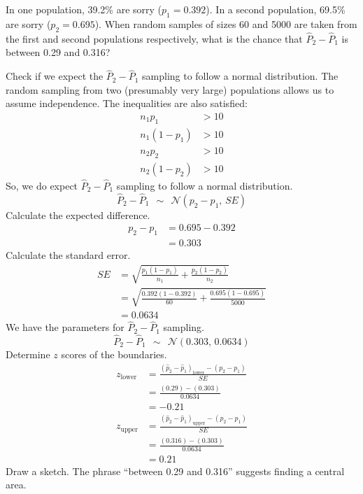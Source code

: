 
\begin{question}
In one population, 39.2\% are sorry (\(p_1 = 0.392\)). In a second
population, 69.5\% are sorry (\(p_2 = 0.695\)). When random samples of
sizes 60 and 5000 are taken from the first and second populations
respectively, what is the chance that \(\hat{P}_2 - \hat{P}_1\) is
between 0.29 and 0.316?
\end{question}

\begin{solution}
Check if we expect the \(\hat{P}_2 - \hat{P}_1\) sampling to follow a
normal distribution. The random sampling from two (presumably very
large) populations allows us to assume independence. The inequalities
are also satisfied: \[
\begin{aligned}
n_1 p_1 &> 10 \\
n_1 (1-p_1) &> 10\\
n_2 p_2 &> 10 \\
n_2 (1 -p_2) &> 10
\end{aligned}
\] So, we do expect \(\hat{P}_2 - \hat{P}_1\) sampling to follow a
normal distribution.
\[\hat{P}_2 - \hat{P}_1 ~~\sim~~ \mathcal{N}(p_2-p_1,\,SE)\] Calculate
the expected difference. \[
\begin{aligned}
p_2-p_1 &= 0.695-0.392\\
   &= 0.303
\end{aligned}
\] Calculate the standard error. \[
\begin{aligned}
SE &= \sqrt{\frac{p_1(1-p_1)}{n_1}+\frac{p_2(1-p_2)}{n_2}}\\[1em]
   &= \sqrt{\frac{0.392(1-0.392)}{60}+\frac{0.695(1-0.695)}{5000}}\\[1em]
   &= 0.0634
\end{aligned}
\] We have the parameters for \(\hat{P}_2 - \hat{P}_1\) sampling.
\[\hat{P}_2 - \hat{P}_1 ~~\sim~~ \mathcal{N}(0.303,\,0.0634)\] Determine
\(z\) scores of the boundaries. \[
\begin{aligned}
z_\text{lower}  &= \frac{(\hat{p}_2-\hat{p}_1)_\text{lower}-(p_2-p_1)}{SE} \\[1em]
   &= \frac{(0.29) - (0.303)}{0.0634} \\[1em]
   &= -0.21\\[1em]
z_\text{upper}  &= \frac{(\hat{p}_2-\hat{p}_1)_\text{upper}-(p_2-p_1)}{SE} \\[1em]
   &= \frac{(0.316) - (0.303)}{0.0634} \\[1em]
   &= 0.21
\end{aligned}
\] Draw a sketch. The phrase ``between 0.29 and 0.316'' suggests finding
a central area.


\end{solution}
